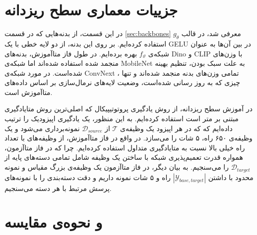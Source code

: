\section{جزییات معماری سطح ریز‌دانه}

در این قسمت، از بدنه‌هایی که در قسمت 
\ref{sec:backbones}
معرفی شد، در قالب 
$g_\theta$
استفاده کرده‌ایم. بر روی این بدنه، از دو لایه خطی با یک 
GELU
در بین آن‌ها به عنوان شبکه‌ی 
$f_\vartheta$
بهره برده‌ایم. در طول فاز متا‌آموزش، بدنه‌های Dino و CLIP با وزن‌های منجمد شده استفاده شده‌اند اما شبکه‌ی MobileNet به علت سبک بودن، تنظیم بهینه شده‌است. در مورد شبکه‌ی ConvNext
، تمامی وزن‌های بدنه منجمد شده‌اند و تنها چیزی که به روز رسانی شده‌است، وضعیت لایه‌های نرمال‌سازی بر اساس داده‌های متا‌آموزش است.

در آموزش سطح ریزدانه، از روش یادگیری پروتوتیپیکال که اصلی‌ترین روش متایادگیری مبتنی بر متر است استفاده کرده‌ایم. به این منظور، یک یادگیری اپیزودیک را ترتیب داده‌ایم که که در هر اپیزود یک وظیفه‌ی 
$\mathcal{T}$
از 
$\mathcal{D}_{source}$
نمونه‌برداری می‌شود و یک وظیفه‌ی ۶۵۰ راه، ۵ شات را می‌سازد. در واقع در فاز متاآموزش، از وظیفه‌های با تعداد راه خیلی بالا نسبت به متایادگیری متداول استفاده کرده‌ایم. چرا که در فاز متاآزمون، همواره قدرت تعمیم‌پذیری شبکه با ساختن یک وظیفه شامل تمامی دسته‌های پایه از 
$\mathcal{D}_{target}$
را می‌سنجیم. به بیان دیگر، در فاز متاآزمون یک وظیفه‌ی بزرگ مقیاس و نمونه محدود با داشتن 
$|\mathcal{Y}_{base,target}|$
راه و ۵ شات نمونه داریم و دقت دسته‌بندی را با نمونه‌های پرسش مرتبط با هر دسته می‌سنجیم.


\section{
	و نحو‌ه‌ی مقایسه
} \label{sec:baselines}

